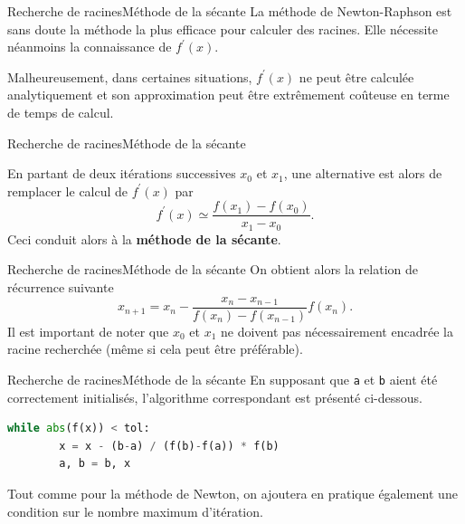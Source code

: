 \documentclass[usenames,dvipsnames,svgnames,10pt,aspectratio=169]{beamer}
\begin{document}
\begin{frame}[t, c]{Recherche de racines}{Méthode de la sécante}
  La méthode de Newton-Raphson est sans doute la méthode la plus efficace pour calculer des racines.
  Elle nécessite néanmoins la connaissance de $f^{\prime}(x)$.
  
  \bigskip
  
  Malheureusement, dans certaines situations, $f^{\prime}(x)$ ne peut être calculée analytiquement et son approximation peut être extrêmement coûteuse en terme de temps de calcul.
  \vspace{1cm}
\end{frame}

\begin{frame}[t, c]{Recherche de racines}{Méthode de la sécante}
  \begin{minipage}{.68\textwidth}
    En partant de deux itérations successives $x_0$ et $x_1$, une alternative est alors de remplacer le calcul de $f^{\prime}(x)$ par
    \[
    f^{\prime}(x) \simeq \dfrac{f(x_1) - f(x_0)}{x_1 - x_0}.
    \]
    Ceci conduit alors à la \alert{\textbf{méthode de la sécante}}.
  \end{minipage}%
  \hfill
  \begin{minipage}{.28\textwidth}
  \end{minipage}
\end{frame}

\begin{frame}[t, c]{Recherche de racines}{Méthode de la sécante}
  On obtient alors la relation de récurrence suivante
  \[
  x_{n+1} = x_n - \dfrac{x_n - x_{n-1}}{f(x_n) - f(x_{n-1})} f(x_n).
  \]
  Il est important de noter que $x_0$ et $x_1$ ne doivent pas nécessairement encadrée la racine recherchée (même si cela peut être préférable).
\end{frame}


\begin{frame}[t, c, fragile]{Recherche de racines}{Méthode de la sécante}
  En supposant que \verb+a+ et \verb+b+ aient été correctement initialisés, l'algorithme correspondant est présenté ci-dessous.

  \bigskip
  
  \begin{lstlisting}[language=Python]
    while abs(f(x)) < tol:
        x = x - (b-a) / (f(b)-f(a)) * f(b)
        a, b = b, x
  \end{lstlisting}
  
  \bigskip
  
  Tout comme pour la méthode de Newton, on ajoutera en pratique également une condition sur le nombre maximum d'itération.
\end{frame}
\end{document}
